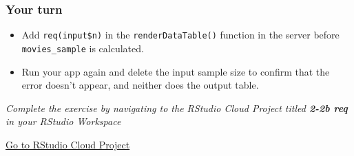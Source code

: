\documentclass[
  letterpaper,
  DIV=11,
  numbers=noendperiod]{scrreprt}
\begin{document}
\hypertarget{your-turn-7}{%
\subsubsection{Your turn}\label{your-turn-7}}

\begin{itemize}
\item
  Add \texttt{req(input\$n)} in the \texttt{renderDataTable()} function
  in the server before \texttt{movies\_sample} is calculated.
\item
  Run your app again and delete the input sample size to confirm that
  the error doesn't appear, and neither does the output table.
\end{itemize}

\emph{Complete the exercise by navigating to the RStudio Cloud Project
titled \textbf{2-2b req} in your RStudio Workspace}

\href{https://rstudio.cloud/spaces/81721/join?access_code=I4VJaNsKfTqR3Td9hLP7E1nz8\%2FtMg6Xbw9Bgqumv}{
Go to RStudio Cloud Project}
\end{document}
